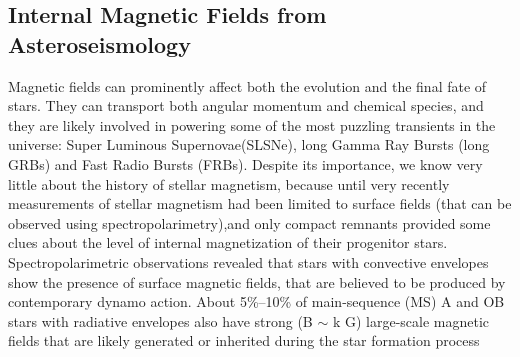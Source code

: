 {\color{red}\subsection{Internal Magnetic Fields from Asteroseismology}}
Magnetic fields can prominently affect both the evolution and the final fate of stars. They can transport both angular momentum and chemical species, and they are likely involved in powering some of the most puzzling transients in the universe: Super Luminous Supernovae(SLSNe), long Gamma Ray Bursts (long GRBs) and Fast Radio Bursts (FRBs). Despite its importance, we know very little about the history of stellar magnetism, because until very recently measurements of stellar magnetism had been limited to surface fields (that can be observed using spectropolarimetry),and only compact remnants provided some clues about the level of internal magnetization of their progenitor stars. Spectropolarimetric observations revealed that stars with convective envelopes show the presence of surface magnetic fields, that are believed to be produced by contemporary dynamo action. About 5\%–10\% of main-sequence (MS) A and OB stars with radiative envelopes also have strong (B $\sim$ k G) large-scale magnetic fields that are likely generated or inherited during the star formation process  \citep[fossil fields, see e.g.,][]{2012ASPC..464..405W}